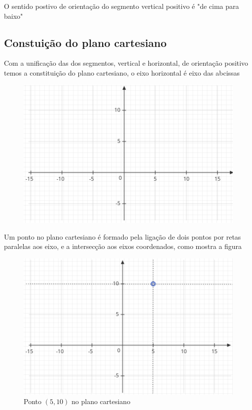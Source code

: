 \begin{multicols*}{2}
\begin{itemize}
\begin{itemize}
\begin{figure}[H]
\begin{tikzpicture}[x=0.75pt,y=0.75pt,yscale=-1,xscale=1]
                            \end{tikzpicture}
                        \end{figure}

              \end{itemize}

    \end{itemize}
    O sentido postivo de orientação do segmento vertical positivo é "de cima para baixo"
    \subsection*{Constuição do plano cartesiano}
    Com a unificação das dos segmentos, vertical e horizontal, de orientação positivo temos a constituição do plano cartesiano, o eixo horizontal é eixo das abcissas

    \begin{figure}[H]
        \centering
        \includegraphics[scale=0.5]{assets/rafael/img25.png}
    \end{figure}
    Um ponto no plano cartesiano é formado pela ligação de dois pontos por retas paralelas aos eixo, e a intersecção aos eixos coordenados, como mostra a figura
    \begin{figure}[H]
        \centering
        \caption{Ponto $(5,10)$ no plano cartesiano}
        \includegraphics[scale=0.5]{assets/rafael/img26.png}
    \end{figure}


\end{multicols*}
